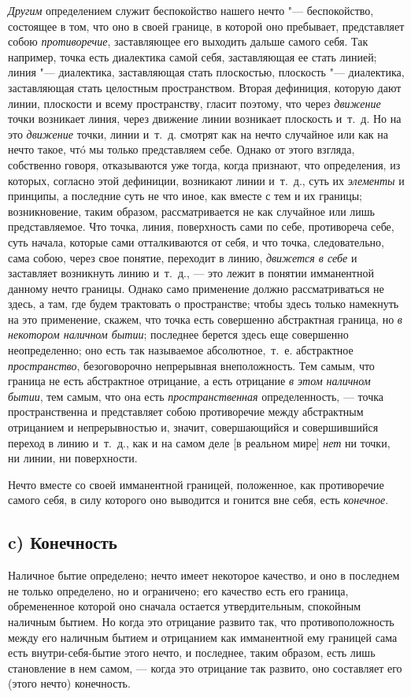 {\em Другим} определением служит беспокойство нашего
нечто "--- беспокойство, состоящее в том, что оно в своей границе, в которой
оно пребывает, представляет собою {\em противоречие},
заставляющее его выходить дальше самого себя. Так например, точка есть
диалектика самой себя, заставляющая ее стать линией; линия "--- диалектика,
заставляющая стать плоскостью, плоскость "--- диалектика, заставляющая стать
целостным пространством. Вторая дефиниция, которую дают линии, плоскости и
всему пространству, гласит поэтому, что через
{\em движение} точки возникает линия, через движение
линии возникает плоскость и~т.~д. Но на это
{\em движение} точки, линии и~т.~д. смотрят как на
нечто случайное или как на нечто такое, чтó мы только представляем себе.
Однако от этого взгляда, собственно говоря, отказываются уже тогда, когда
признают, что определения, из которых, согласно этой дефиниции, возникают
линии и~т.~д., суть их {\em элементы} и принципы, а
последние суть не что иное, как вместе с тем и их границы; возникновение,
таким образом, рассматривается не как случайное или лишь представляемое.
Что точка, линия, поверхность сами по себе, противореча себе, суть начала,
которые сами отталкиваются от себя, и что точка, следовательно, сама собою,
через свое понятие, переходит в линию, {\em движется в
себе} и заставляет возникнуть линию и~т.~д., — это лежит в понятии
имманентной данному нечто границы. Однако само применение должно
рассматриваться не здесь, а там, где будем трактовать о пространстве; чтобы
здесь только намекнуть на это применение, скажем, что точка есть совершенно
абстрактная граница, но {\em в некотором наличном
бытии}; последнее берется здесь еще совершенно неопределенно; оно есть так
называемое абсолютное,~т.~е. абстрактное
{\em пространство}, безоговорочно непрерывная
внеположность. Тем самым, что граница не есть абстрактное отрицание, а есть
отрицание {\em в этом наличном бытии}, тем самым, что
она есть {\em пространственная} определенность, — точка
пространственна и представляет собою противоречие между абстрактным
отрицанием и непрерывностью и, значит, совершающийся и совершившийся
переход в линию и~т.~д., как и на самом деле [в реальном мире]
{\em нет} ни точки, ни линии, ни поверхности.

Нечто вместе со своей имманентной границей, положенное, как противоречие
самого себя, в силу которого оно выводится и гонится вне себя, есть
{\em конечное}.

\subsection*{c) Конечность}
Наличное бытие определено; нечто имеет некоторое качество, и оно в последнем
не только определено, но и ограничено; его качество есть его граница,
обремененное которой оно сначала остается утвердительным, спокойным
наличным бытием. Но когда это отрицание развито так, что противоположность
между его наличным бытием и отрицанием как имманентной ему границей сама
есть внутри-себя-бытие этого нечто, и последнее, таким образом, есть лишь
становление в нем самом, — когда это отрицание так развито, оно составляет
его (этого нечто) конечность.

